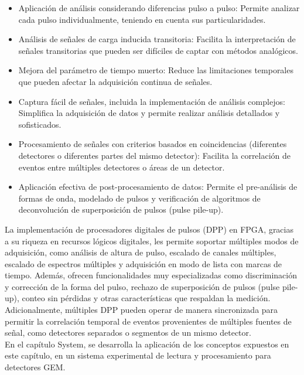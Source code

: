 \documentclass[]{book}
\begin{document}
\begin{itemize}
    \item Aplicación de análisis considerando diferencias pulso a pulso: Permite analizar cada pulso individualmente, teniendo en cuenta sus particularidades.
    \item Análisis de señales de carga inducida transitoria: Facilita la interpretación de señales transitorias que pueden ser difíciles de captar con métodos analógicos.
    \item  Mejora del parámetro de tiempo muerto: Reduce las limitaciones temporales que pueden afectar la adquisición continua de señales.
    \item Captura fácil de señales, incluida la implementación de análisis complejos: Simplifica la adquisición de datos y permite realizar análisis detallados y sofisticados.
    \item Procesamiento de señales con criterios basados en coincidencias (diferentes detectores o diferentes partes del mismo detector): Facilita la correlación de eventos entre múltiples detectores o áreas de un detector.
    \item Aplicación efectiva de post-procesamiento de datos: Permite el pre-análisis de formas de onda, modelado de pulsos y verificación de algoritmos de deconvolución de superposición de pulsos (pulse pile-up).

\end{itemize}

\noindent La implementación de procesadores digitales de pulsos (DPP) en FPGA, gracias a su riqueza en recursos lógicos digitales, les permite soportar múltiples modos de adquisición, como análisis de altura de pulso, escalado de canales múltiples, escalado de espectros múltiples y adquisición en modo de lista con marcas de tiempo. Además, ofrecen funcionalidades muy especializadas como discriminación y corrección de la forma del pulso, rechazo de superposición de pulsos (pulse pile-up), conteo sin pérdidas y otras características que respaldan la medición. Adicionalmente, múltiples DPP pueden operar de manera sincronizada para permitir la correlación temporal de eventos provenientes de múltiples fuentes de señal, como detectores separados o segmentos de un mismo detector. \\

\noindent En el capítulo System, se desarrolla la aplicación de los conceptos expuestos en este capítulo, en un sistema experimental de lectura y procesamiento para detectores GEM.
\end{document}

